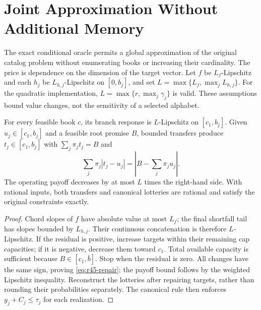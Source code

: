 \section{Joint Approximation Without Additional Memory}\label{sec:r45-net}
The exact conditional oracle permits a global approximation of the original catalog problem without enumerating books or increasing their cardinality. The price is dependence on the dimension of the target vector. Let $f$ be $L_f$-Lipschitz and each $h_j$ be $L_{h,j}$-Lipschitz on $[0,b_j]$, and set $L=\max\{L_f,\max_jL_{h,j}\}$. For the quadratic implementation, $L=\max\{r,\max_j\gamma_j\}$ is valid. These assumptions bound value changes, not the sensitivity of a selected alphabet.

\begin{lemma}\label{lem:r45-repair}
For every feasible book $c$, its branch response is $L$-Lipschitz on $[c_1,b_j]$. Given $u_j\in[c_1,b_j]$ and a feasible root promise $B$, bounded transfers produce $t_j\in[c_1,b_j]$ with $\sum_j\pi_jt_j=B$ and
\begin{equation}\label{eq:r45-repair}
 \sum_j\pi_j|t_j-u_j|=\left|B-\sum_j\pi_ju_j\right|.
\end{equation}
The operating payoff decreases by at most $L$ times the right-hand side. With rational inputs, both transfers and canonical lotteries are rational and satisfy the original constraints exactly.
\end{lemma}
\begin{proof}
Chord slopes of $f$ have absolute value at most $L_f$; the final shortfall tail has slopes bounded by $L_{h,j}$. Their continuous concatenation is therefore $L$-Lipschitz. If the residual is positive, increase targets within their remaining cap capacities; if it is negative, decrease them toward $c_1$. Total available capacity is sufficient because $B\in[c_1,\bar b]$. Stop when the residual is zero. All changes have the same sign, proving \eqref{eq:r45-repair}; the payoff bound follows by the weighted Lipschitz inequality. Reconstruct the lotteries after repairing targets, rather than rounding their probabilities separately. The canonical rule then enforces $y_j+C_j\leq\tau_j$ for each realization.
\end{proof}

